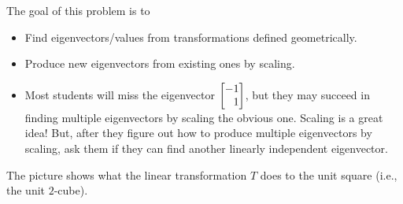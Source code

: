 \documentclass{problemset}
\begin{document}
	\question
	\begin{annotation}
		\begin{goals}

			The goal of this problem is to
			\begin{itemize}
				\item Find eigenvectors/values from transformations defined geometrically.
				\item Produce new eigenvectors from existing ones by scaling.
			\end{itemize}
		\end{goals}

		\begin{notes}
			\begin{itemize}
				\item Most students will miss the eigenvector $\mat{-1\\1}$, but they
					may succeed in finding multiple eigenvectors by scaling the obvious one.
					Scaling is a great idea! But, after they figure out how to produce multiple
					eigenvectors by scaling, ask them if they can find another linearly independent
					eigenvector.
			\end{itemize}
		\end{notes}
	\end{annotation}
	The picture shows what the linear transformation $T$ does to the unit square (i.e., the unit $2$-cube).
\end{document}
